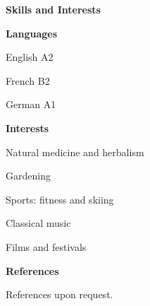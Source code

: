\documentclass[a4paper,12pt,final]{memoir}
\newcommand{\Sep}{\vspace{1.5em}}
\newcommand{\SmallSep}{\vspace{0.5em}}
\newenvironment{Career Profile}
	{\ignorespaces\textbf{\color{ForestGreen} Career Profile}}
	{\Sep\ignorespacesafterend}
\newenvironment{Key experience}
	{\ignorespaces\textbf{\color{ForestGreen} Key experience}}
	{\Sep\ignorespacesafterend}
\newcommand{\CVSection}[1]
	{\Large\textbf{#1}\par
	\SmallSep\normalsize\normalfont}
\newcommand{\CVItem}[1]
	{\textbf{\color{ForestGreen} #1}}
\begin{document}
\CVSection{Skills and Interests}
\CVItem{Languages}
\begin{multicols}{3}
\begin{compactitem}[\color{ForestGreen}$\circ$]
	\item English A2
	\item French  B2
	\item German  A1
\end{compactitem}
\end{multicols}
\SmallSep

\CVItem{Interests}
\begin{multicols}{3}
\begin{compactitem}[\color{ForestGreen}$\circ$]
	\item Natural medicine and herbalism
	\item Gardening
	\item Sports: fitness and skiing 
	\item Classical music 
	\item Films and  festivals
\end{compactitem}
\end{multicols}
\Sep 

\CVSection{References}
References upon request.

\end{document}
